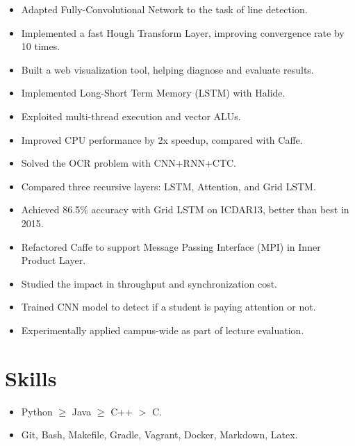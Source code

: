 \documentclass[letterpaper,11pt]{article}
\begin{document}
\begin{itemize}
  \begin{itemize}
  \item Adapted Fully-Convolutional Network to the task of line detection.
  \item Implemented a fast Hough Transform Layer, improving convergence rate by 10 times.
  \item Built a web visualization tool, helping diagnose and evaluate results.
  \end{itemize}
  \begin{itemize}
  \item Implemented Long-Short Term Memory (LSTM) with Halide.
  \item Exploited multi-thread execution and vector ALUs.
  \item Improved CPU performance by 2x speedup, compared with Caffe.  \end{itemize}
  \begin{itemize}
  \item Solved the OCR problem with CNN+RNN+CTC.
  \item Compared three recursive layers: LSTM, Attention, and Grid LSTM.
  \item Achieved 86.5\% accuracy with Grid LSTM on ICDAR13, better than best in 2015.
  \end{itemize}
  \begin{itemize}
  \item Refactored Caffe to support Message Passing Interface (MPI) in Inner Product Layer.
  \item Studied the impact in throughput and synchronization cost.
  \end{itemize}
  \begin{itemize}
  \item Trained CNN model to detect if a student is paying attention or not.
  \item Experimentally applied campus-wide as part of lecture evaluation.
  \end{itemize}
\end{itemize}

\section*{Skills}
\begin{itemize}
\item Python $\ge$ Java $\ge$ C++ $>$ C.
\item Git, Bash, Makefile, Gradle, Vagrant, Docker, Markdown, Latex.
\end{itemize}
\end{document}
